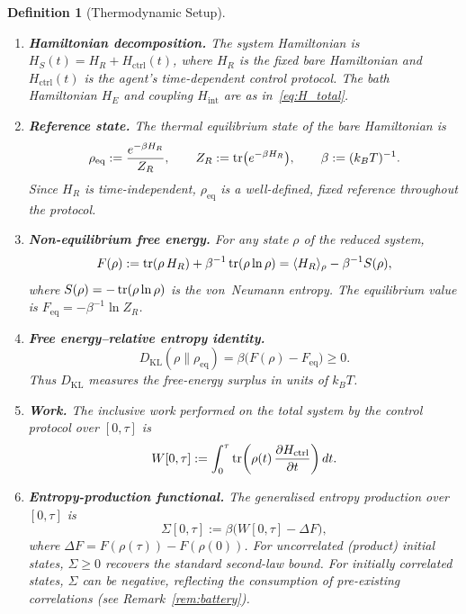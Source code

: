 \documentclass[12pt]{article}
\newtheorem{definition}[theorem]{Definition}
\begin{document}
\begin{definition}[Thermodynamic Setup]
\label{def:thermo_setup}
\leavevmode
\begin{enumerate}
\item \textbf{Hamiltonian decomposition.}
  The system Hamiltonian is
  $H_S(t) = H_R + H_{\mathrm{ctrl}}(t)$,
  where $H_R$ is the \emph{fixed} bare Hamiltonian and
  $H_{\mathrm{ctrl}}(t)$ is the agent's time-dependent
  control protocol.
  The bath Hamiltonian $H_E$ and coupling $H_{\mathrm{int}}$
  are as in~\eqref{eq:H_total}.

\item \textbf{Reference state.}
  The thermal equilibrium state of the bare Hamiltonian is
  \begin{equation}
  \label{eq:rho_eq}
  \rho_{\mathrm{eq}} := \frac{e^{-\beta H_R}}{Z_R},
  \qquad Z_R := \tr(e^{-\beta H_R}),
  \qquad \beta := (k_B T)^{-1}.
  \end{equation}
  Since $H_R$ is time-independent, $\rho_{\mathrm{eq}}$ is a
  well-defined, fixed reference throughout the protocol.

\item \textbf{Non-equilibrium free energy.}
  For any state $\rho$ of the reduced system,
  \begin{equation}
  \label{eq:F_neq}
  F(\rho) := \tr(\rho\, H_R) + \beta^{-1}\tr(\rho\ln\rho)
  = \langle H_R \rangle_\rho - \beta^{-1} S(\rho),
  \end{equation}
  where $S(\rho) = -\tr(\rho\ln\rho)$ is the von~Neumann entropy.
  The equilibrium value is $F_{\mathrm{eq}} = -\beta^{-1}\ln Z_R$.

\item \textbf{Free energy--relative entropy identity.}
  \begin{equation}
  \label{eq:DKL_F}
  D_{\mathrm{KL}}(\rho \| \rho_{\mathrm{eq}})
  = \beta\bigl(F(\rho) - F_{\mathrm{eq}}\bigr) \geq 0.
  \end{equation}
  Thus $D_{\mathrm{KL}}$ measures the free-energy surplus in
  units of $k_B T$.

\item \textbf{Work.}
  The inclusive work performed on the total system by the control protocol
  over $[0,\tau]$ is
  \begin{equation}
  \label{eq:work}
  W[0,\tau] := \int_0^\tau
  \tr\!\left(\rho(t)\,
  \frac{\partial H_{\mathrm{ctrl}}}{\partial t}\right) dt.
  \end{equation}

\item \textbf{Entropy-production functional.}
  The \emph{generalised entropy production} over $[0,\tau]$ is
  \begin{equation}
  \label{eq:Sigma}
  \Sigma[0,\tau] := \beta\bigl(W[0,\tau] - \Delta F\bigr),
  \end{equation}
  where $\Delta F = F(\rho(\tau)) - F(\rho(0))$.
  For uncorrelated (product) initial states,
  $\Sigma \geq 0$ recovers the standard second-law bound.
  For initially correlated states, $\Sigma$ can be
  \emph{negative}, reflecting the consumption of
  pre-existing correlations
  (see Remark~\ref{rem:battery}).
\end{enumerate}
\end{definition}
\end{document}
